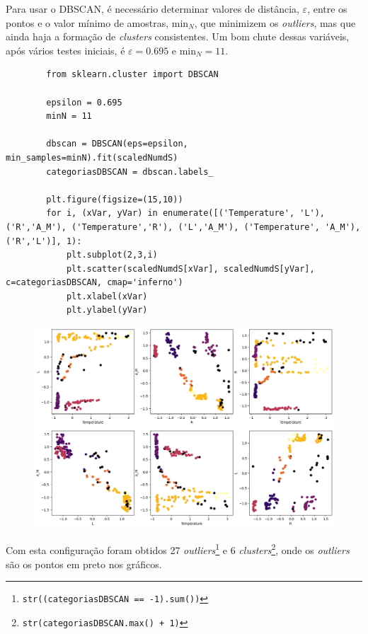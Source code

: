 

Para usar o DBSCAN, é necessário determinar valores de distância, $\varepsilon$, entre os pontos e o valor mínimo de amostras, $\text{min}_{N}$, que minimizem os \textit{outliers}, mas que ainda haja a formação de \textit{clusters} consistentes. Um bom chute dessas variáveis, após vários testes iniciais, é $\varepsilon = 0.695$ e $\text{min}_{N} = 11$. 
\begin{longlisting}
    \begin{verbatim}
        from sklearn.cluster import DBSCAN

        epsilon = 0.695
        minN = 11
        
        dbscan = DBSCAN(eps=epsilon, min_samples=minN).fit(scaledNumdS)
        categoriasDBSCAN = dbscan.labels_
        
        plt.figure(figsize=(15,10))
        for i, (xVar, yVar) in enumerate([('Temperature', 'L'), ('R','A_M'), ('Temperature','R'), ('L','A_M'), ('Temperature', 'A_M'), ('R','L')], 1):
            plt.subplot(2,3,i)
            plt.scatter(scaledNumdS[xVar], scaledNumdS[yVar], c=categoriasDBSCAN, cmap='inferno')
            plt.xlabel(xVar)
            plt.ylabel(yVar)
    \end{verbatim}
\end{longlisting}
\begin{figure}[H]
    \centering
    \includegraphics[width=1\linewidth]{figures/DBSCAN.png}
\end{figure}

Com esta configuração foram obtidos 27 \textit{outliers}\footnote{\texttt{str((categoriasDBSCAN == -1).sum())}} e 6 \textit{clusters}\footnote{\texttt{str(categoriasDBSCAN.max() + 1)}}, onde os \textit{outliers} são os pontos em preto nos gráficos. 
